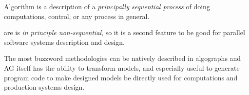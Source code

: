 {}

\noindent
\href{http://en.wikipedia.org/wiki/Algorithm}{Algorithm} is a description of a
\emph{principally sequential process} of doing computations, control, or any
process in general.

\medskip\noindent
{} are is \emph{in principle non-sequential}, so it is a second feature to be
good for parallel software systems description and design.

\medskip\noindent
The most buzzword methodologies can be natively described in algographs and AG
itself has the ability to transform models, and especially useful to generate
program code to make designed models be directly used for computations and
production systems design.

